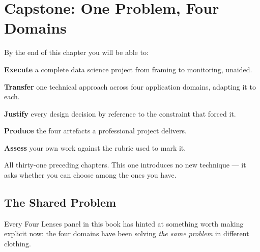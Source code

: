 \chapter{Capstone: One Problem, Four Domains}\label{ch:capstone}

\begin{outcomes}
By the end of this chapter you will be able to:
\begin{tight}
  \item \textbf{Execute} a complete data science project from framing to monitoring, unaided.
  \item \textbf{Transfer} one technical approach across four application domains, adapting it to each.
  \item \textbf{Justify} every design decision by reference to the constraint that forced it.
  \item \textbf{Produce} the four artefacts a professional project delivers.
  \item \textbf{Assess} your own work against the rubric used to mark it.
\end{tight}
\end{outcomes}

\begin{prereq}
All thirty-one preceding chapters. This one introduces no new technique --- it asks
whether you can choose among the ones you have.
\end{prereq}

\section{The Shared Problem}

Every Four Lenses panel in this book has hinted at something worth making explicit
now: the four domains have been solving \emph{the same problem} in different
clothing.

